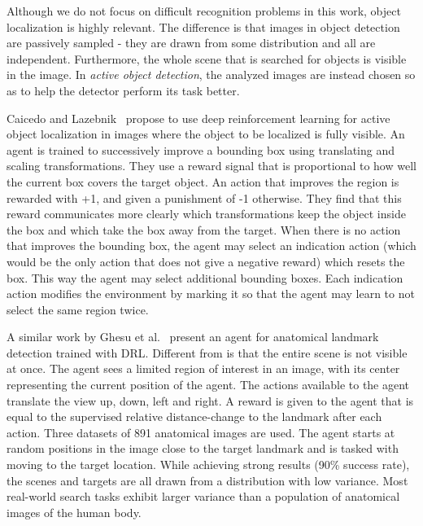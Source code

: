 Although we do not focus on difficult recognition problems in this work, object localization is highly relevant.
The difference is that images in object detection are passively sampled - they are drawn from some distribution and all are independent.
Furthermore, the whole scene that is searched for objects is visible in the image.
In \textit{active object detection}, the analyzed images are instead chosen so as to help the detector perform its task better.

Caicedo and Lazebnik~\cite{caicedo_active_2015} propose to use deep reinforcement learning for active object localization in images where the object to be localized is fully visible.
An agent is trained to successively improve a bounding box using translating and scaling transformations.
They use a reward signal that is proportional to how well the current box covers the target object.
An action that improves the region is rewarded with +1, and given a punishment of -1 otherwise.
They find that this reward communicates more clearly which transformations keep the object inside the box and which take the box away from the target.
When there is no action that improves the bounding box, the agent may select an indication action (which would be the only action that does not give a negative reward) which resets the box.
This way the agent may select additional bounding boxes.
Each indication action modifies the environment by marking it so that the agent may learn to not select the same region twice.

A similar work by Ghesu et al.~\cite{ghesu_artificial_2016} present an agent for anatomical landmark detection trained with DRL.
Different from \cite{caicedo_active_2015} is that the entire scene is not visible at once.
The agent sees a limited region of interest in an image, with its center representing the current position of the agent.
The actions available to the agent translate the view up, down, left and right.
A reward is given to the agent that is equal to the supervised relative distance-change to the landmark after each action.
Three datasets of 891 anatomical images are used.
The agent starts at random positions in the image close to the target landmark and is tasked with moving to the target location.
While achieving strong results (90\% success rate), the scenes and targets are all drawn from a distribution with low variance.
Most real-world search tasks exhibit larger variance than a population of anatomical images of the human body.


